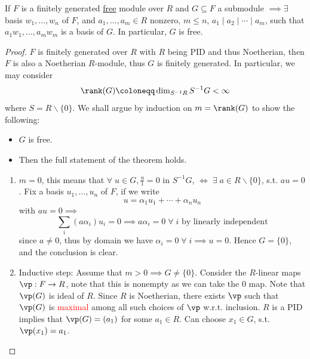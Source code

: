 \begin{theorem}
	\label{thm:submodule-of-free-module-over-pid}
	If \( F \) is a finitely generated \underline{free} module over \( R \) and \( G \subseteq F \) a
	submodule \( \implies \exists \) basis \( w_1,\ldots, w_n \) of \( F \), and \( a_1,\ldots,a_m \in
	R\) nonzero, \( m\leq n \), \( a_1 \mid a_2 \mid \cdots \mid a_m \), such that \( a_1w_1,\ldots,
	a_m w_m \) is a basis of \( G \). In particular, \( G \) is free.
\end{theorem}

\begin{proof}
	\( F \) is finitely generated over \( R \) with \( R \) being PID and thus Noetherian, then \( F \) is also
	a Noetherian \( R \)-module, thus \( G \) is finitely generated. In particular, we may consider
	\[
		\rank(G) \coloneqq \dim_{S^{-1}R}S^{-1}G < \infty
	\]
	where \( S= R \backslash \{0\} \). We shall argue by induction on \( m = \rank(G) \) to show the
	following:
	\begin{itemize}
		\item \( G \) is free.
		\item Then the full statement of the theorem holds.
	\end{itemize}
	\begin{enumerate}
		\item \( m = 0 \), this means that \( \forall \; u \in G, \frac{u}{1} = 0 \) in \( S^{-1} G \),
		      \( \iff \; \exists \; a \in R \backslash \{0\} \), s.t. \( au = 0 \). Fix a basis \(
		      u_1,\ldots,u_n \) of \( F \), if we write
		      \[
			      u = \alpha_1 u_1 + \cdots + \alpha_n u_n
		      \]
		      with \( au = 0 \implies \)
		      \[
			      \sum_{i}(a\alpha_i) u_i = 0 \implies a\alpha_i = 0 \; \forall \; i \text{ by linearly
				      independent}
		      \]
		      since \( a \ne 0 \), thus by domain we have \( \alpha_i = 0\; \forall \; i \implies u=0
		      \). Hence \( G = \{0\} \), and the conclusion is clear.
		\item Inductive step: Assume that \( m > 0 \implies G \ne \{0\} \). Consider the \( R
		      \)-linear maps \( \vp : F \to R \), note that this is nonempty as we can take the \( 0 \)
		      map. Note that \( \vp(G) \) is ideal of \( R \). Since \( R \) is Noetherian, there exists
		      \( \vp \) such that \( \vp(G) \) is \textcolor{red}{maximal} among all such choices of \( \vp \) w.r.t.
		      inclusion. \( R \) is a PID implies that \( \vp(G) = (a_1) \) for some \( a_1 \in R \).
		      Can choose \( x_1 \in G \), s.t. \( \vp(x_1) = a_1 \).


\end{enumerate}
\end{proof}

